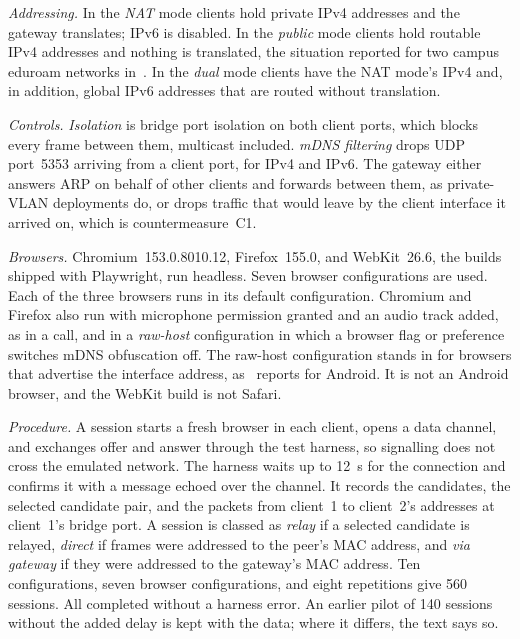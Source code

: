 \documentclass[conference]{IEEEtran}
\begin{document}
\textit{Addressing.} In the \textit{NAT} mode clients hold private IPv4 addresses and the gateway translates; IPv6 is disabled. In the \textit{public} mode clients hold routable IPv4 addresses and nothing is translated, the situation reported for two campus eduroam networks in~\cite{nibert2025}. In the \textit{dual} mode clients have the NAT mode's IPv4 and, in addition, global IPv6 addresses that are routed without translation.

\textit{Controls.} \textit{Isolation} is bridge port isolation on both client ports, which blocks every frame between them, multicast included. \textit{mDNS filtering} drops UDP port~5353 arriving from a client port, for IPv4 and IPv6. The gateway either answers ARP on behalf of other clients and forwards between them, as private-VLAN deployments do, or drops traffic that would leave by the client interface it arrived on, which is countermeasure~C1.

\textit{Browsers.} Chromium~153.0.8010.12, Firefox~155.0, and WebKit~26.6, the builds shipped with Playwright, run headless. Seven browser configurations are used. Each of the three browsers runs in its default configuration. Chromium and Firefox also run with microphone permission granted and an audio track added, as in a call, and in a \textit{raw-host} configuration in which a browser flag or preference switches mDNS obfuscation off. The raw-host configuration stands in for browsers that advertise the interface address, as~\cite{koysha2025} reports for Android. It is not an Android browser, and the WebKit build is not Safari.

\textit{Procedure.} A session starts a fresh browser in each client, opens a data channel, and exchanges offer and answer through the test harness, so signalling does not cross the emulated network. The harness waits up to 12~s for the connection and confirms it with a message echoed over the channel. It records the candidates, the selected candidate pair, and the packets from client~1 to client~2's addresses at client~1's bridge port. A session is classed as \textit{relay} if a selected candidate is relayed, \textit{direct} if frames were addressed to the peer's MAC address, and \textit{via gateway} if they were addressed to the gateway's MAC address. Ten configurations, seven browser configurations, and eight repetitions give 560 sessions. All completed without a harness error. An earlier pilot of 140 sessions without the added delay is kept with the data; where it differs, the text says so.
\end{document}
